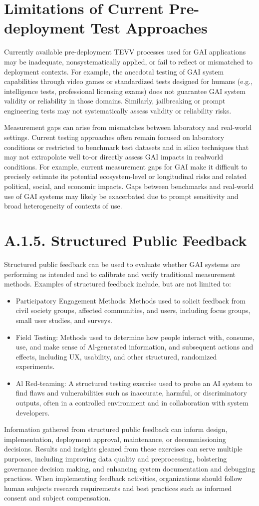 \documentclass[10pt]{article}
\begin{document}
\section*{Limitations of Current Pre-deployment Test Approaches}
Currently available pre-deployment TEVV processes used for GAI applications may be inadequate, nonsystematically applied, or fail to reflect or mismatched to deployment contexts. For example, the anecdotal testing of GAI system capabilities through video games or standardized tests designed for humans (e.g., intelligence tests, professional licensing exams) does not guarantee GAI system validity or reliability in those domains. Similarly, jailbreaking or prompt engineering tests may not systematically assess validity or reliability risks.

Measurement gaps can arise from mismatches between laboratory and real-world settings. Current testing approaches often remain focused on laboratory conditions or restricted to benchmark test datasets and in silico techniques that may not extrapolate well to-or directly assess GAI impacts in realworld conditions. For example, current measurement gaps for GAI make it difficult to precisely estimate its potential ecosystem-level or longitudinal risks and related political, social, and economic impacts. Gaps between benchmarks and real-world use of GAI systems may likely be exacerbated due to prompt sensitivity and broad heterogeneity of contexts of use.
\section*{A.1.5. Structured Public Feedback}
Structured public feedback can be used to evaluate whether GAI systems are performing as intended and to calibrate and verify traditional measurement methods. Examples of structured feedback include, but are not limited to:
\begin{itemize}
  \item Participatory Engagement Methods: Methods used to solicit feedback from civil society groups, affected communities, and users, including focus groups, small user studies, and surveys.
  \item Field Testing: Methods used to determine how people interact with, consume, use, and make sense of Al-generated information, and subsequent actions and effects, including UX, usability, and other structured, randomized experiments.
  \item Al Red-teaming: A structured testing exercise used to probe an AI system to find flaws and vulnerabilities such as inaccurate, harmful, or discriminatory outputs, often in a controlled environment and in collaboration with system developers.
\end{itemize}
Information gathered from structured public feedback can inform design, implementation, deployment approval, maintenance, or decommissioning decisions. Results and insights gleaned from these exercises can serve multiple purposes, including improving data quality and preprocessing, bolstering governance decision making, and enhancing system documentation and debugging practices. When implementing feedback activities, organizations should follow human subjects research requirements and best practices such as informed consent and subject compensation.
\end{document}
